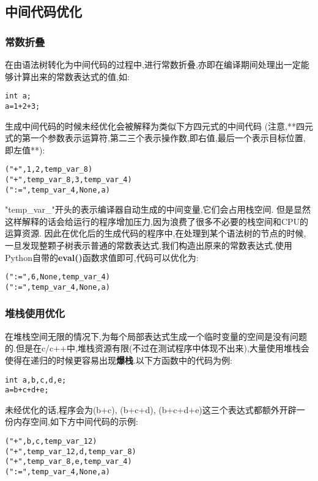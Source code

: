 \documentclass{article}
\begin{document}
\subsection{中间代码优化}

\subsubsection{常数折叠}

在由语法树转化为中间代码的过程中,进行常数折叠,亦即在编译期间处理出一定能够计算出来的常数表达式的值,如:

\begin{verbatim}
int a;
a=1+2+3;
\end{verbatim}

生成中间代码的时候未经优化会被解释为类似下方四元式的中间代码
(注意,**四元式的第一个参数表示运算符,第二三个表示操作数,即右值,最后一个表示目标位置,即左值**):

\begin{verbatim}
("+",1,2,temp_var_8)
("+",temp_var_8,3,temp_var_4)
(":=",temp_var_4,None,a)
\end{verbatim}

"temp\_var\_"开头的表示编译器自动生成的中间变量,它们会占用栈空间.
但是显然这样解释的话会给运行的程序增加压力,因为浪费了很多不必要的栈空间和CPU的运算资源.
因此在优化后的生成代码的程序中,在处理到某个语法树的节点的时候,一旦发现整颗子树表示普通的常数表达式,我们构造出原来的常数表达式,使用Python自带的\textbf{eval()}函数求值即可,代码可以优化为:

\begin{verbatim}
(":=",6,None,temp_var_4)
(":=",temp_var_4,None,a)
\end{verbatim}


\subsubsection{堆栈使用优化}

在堆栈空间无限的情况下,为每个局部表达式生成一个临时变量的空间是没有问题的.但是在c/c++中,堆栈资源有限(不过在测试程序中体现不出来),大量使用堆栈会使得在递归的时候更容易出现\textbf{爆栈}.以下方函数中的代码为例:

\begin{verbatim}
int a,b,c,d,e;
a=b+c+d+e;
\end{verbatim}

未经优化的话,程序会为(b+c), (b+c+d), (b+c+d+e)这三个表达式都额外开辟一份内存空间,如下方中间代码的示例:

\begin{verbatim}
("+",b,c,temp_var_12)
("+",temp_var_12,d,temp_var_8)
("+",temp_var_8,e,temp_var_4)
(":=",temp_var_4,None,a)
\end{verbatim}
\end{document}
